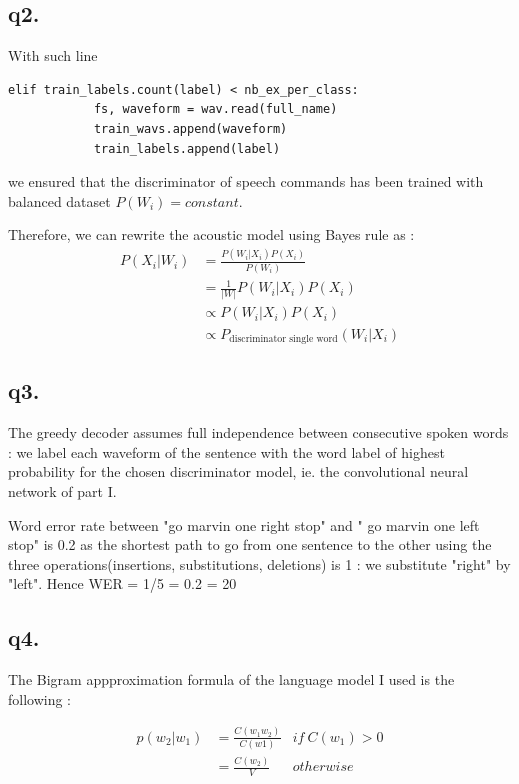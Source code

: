 \documentclass[11pt]{article}
\begin{document}
\subsection*{q2.}

With such line 

\begin{lstlisting}
elif train_labels.count(label) < nb_ex_per_class:
            fs, waveform = wav.read(full_name)
            train_wavs.append(waveform)
            train_labels.append(label)
\end{lstlisting}            

we ensured that the discriminator of speech commands has been trained with balanced dataset $P(W_i) = constant$.

Therefore, we can rewrite the acoustic model using Bayes rule as :
 \begin{align*}
 P(X_i|W_i) &= \frac{P(W_i|X_i)P(X_i)}{P(W_i)} \\
 & =  \frac{1}{|W|} P(W_i|X_i)P(X_i) \\
 &  \propto P(W_i|X_i)P(X_i) \\
 & \propto P_{\text{discriminator single word}}(W_i|X_i) 
 \end{align*} 
 
 \subsection*{q3.}
 
The greedy decoder assumes full independence between consecutive spoken words : we label each waveform of the sentence with the word label of highest probability for the chosen discriminator model, ie. the convolutional neural network of part I.

Word error rate between "go marvin one right stop" and " go marvin one left stop" is 0.2 as the shortest path to go from one sentence to the other using the three operations(insertions, substitutions, deletions) is 1 : we substitute "right" by "left". Hence WER = 1/5 = 0.2 = 20%

 
  \subsection*{q4.}
  
  The Bigram appproximation formula of the language model I used is the following :
  
  \begin{align} p(w_2|w_1) &= \frac{C(w_1w_2)}{C(w1)} & if ~ C(w_1)>0 \\
  &= \frac{C(w_2)}{V}  & otherwise
  \end{align}
  
\end{document}

